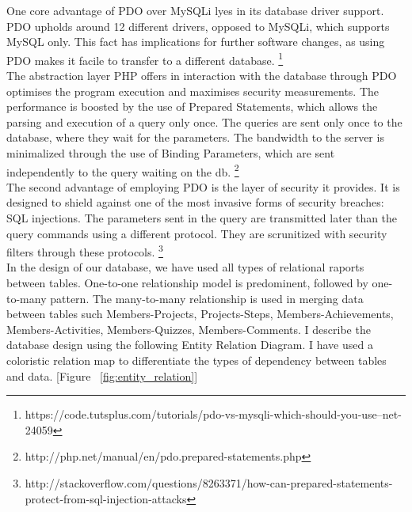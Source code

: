 One core advantage of PDO over MySQLi lyes in its database driver support. PDO upholds around 12 different drivers, opposed to MySQLi, which supports MySQL only. This fact has implications for further software changes, as using PDO makes it facile to transfer to a different database. \footnote{https://code.tutsplus.com/tutorials/pdo-vs-mysqli-which-should-you-use--net-24059}\\  

The abstraction layer PHP offers in interaction with the database through PDO optimises the program execution and maximises security measurements.
The performance is boosted by the use of Prepared Statements, which allows the parsing and execution of a query only once. The queries are sent only once to the database, where they wait for the parameters. The bandwidth to the server is minimalized through the use of Binding Parameters, which are sent independently to the query waiting on the db. \footnote{http://php.net/manual/en/pdo.prepared-statements.php}\\ 

The second advantage of employing PDO is the layer of security it provides. It is designed to shield against one of the most invasive forms of security breaches: SQL injections. The parameters sent in the query are transmitted later than the query commands using a different protocol. They are scrunitized with security filters through these protocols. \footnote{http://stackoverflow.com/questions/8263371/how-can-prepared-statements-protect-from-sql-injection-attacks}\\ 

In the design of our database, we have used all types of relational raports between tables. One-to-one relationship model is predominent, followed by one-to-many pattern. 
The many-to-many relationship is used in merging data between tables such Members-Projects, Projects-Steps, Members-Achievements, Members-Activities, Members-Quizzes, Members-Comments.
I describe the database design using the following Entity Relation Diagram. I have used a coloristic relation map to differentiate the types of dependency between tables and data.
[Figure ~\ref{fig:entity_relation}]\\



